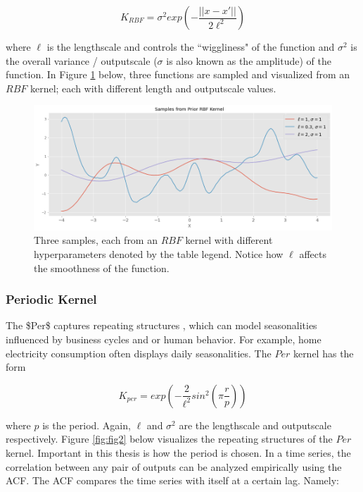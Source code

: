 \begin{equation}
    K_{RBF} = \sigma^2 exp(-\frac{||x - x'||}{2 \ell^2})
\end{equation}

where $\ell$ is the lengthscale and controls the ``wiggliness" of the function and $\sigma^2$ is the overall variance / outputscale  ($\sigma$ is also known as the amplitude) of the function. In Figure \ref{fig:fig1} below, three functions are sampled and visualized from an $RBF$ kernel; each with different length and outputscale values.

\begin{figure}[htp]
\centering
\graphicspath{ {./images/} }
\includegraphics[scale=0.49]{images/samples_rbf_prior.png}
\caption{Three samples, each from an $RBF$ kernel with different hyperparameters denoted by the table legend. Notice how $\ell$ affects the smoothness of the function.}
\label{fig:fig1}
\end{figure}

\subsubsection{Periodic Kernel}

The \ac{$Per$} captures repeating structures \cite{pml1Book}, which can model seasonalities influenced by business cycles and or human behavior. For example, home electricity consumption often displays daily seasonalities. The $Per$ kernel has the form

\begin{equation}
K_{per} = exp(-\frac{2}{\ell^2} sin^2 (\pi \frac{r}{p}))
\end{equation}

where $p$ is the period. Again, $\ell$ and $\sigma^2$ are the lengthscale and outputscale respectively. Figure \ref{fig:fig2} below visualizes the repeating structures of the $Per$ kernel. Important in this thesis is how the period is chosen. In a time series, the correlation between any pair of outputs can be analyzed empirically using the ACF. The ACF compares the time series with itself at a certain lag. Namely:

